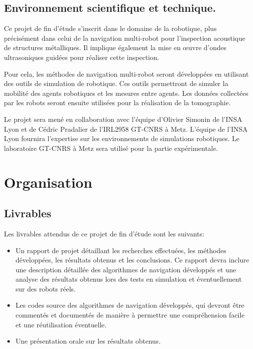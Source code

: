 \documentclass[init,francais,RandD]{rapportPFE}  %
\begin{document}
		\subsection{Environnement scientifique et technique.}
			Ce projet de fin d'étude s'inscrit dans le domaine de la robotique, plus précisément dans celui de la navigation multi-robot pour l'inspection acoustique de structures métalliques. Il implique également la mise en œuvre d'ondes ultrasoniques guidées pour réaliser cette inspection.

			Pour cela, les méthodes de navigation multi-robot seront développées en utilisant des outils de simulation de robotique. Ces outils permettront de simuler la mobilité des agents robotiques et les mesures entre agents. Les données collectées par les robots seront ensuite utilisées pour la réalisation de la tomographie.

			Le projet sera mené en collaboration avec l'équipe d'Olivier Simonin de l'INSA Lyon et de Cédric Pradalier de l'IRL2958 GT-CNRS à Metz. L'équipe de l'INSA Lyon fournira l'expertise sur les environnements de simulations robotiques. Le laboratoire GT-CNRS à Metz sera utilisé pour la partie expérimentale.
	\section{Organisation}
		\subsection{Livrables}
			Les livrables attendus de ce projet de fin d'étude sont les suivants:
			\begin{itemize}
				\item Un rapport de projet détaillant les recherches effectuées, les méthodes développées, les résultats obtenus et les conclusions. Ce rapport devra inclure une description détaillée des algorithmes de navigation développés et une analyse des résultats obtenus lors des tests en simulation et éventuellement sur des robots réels.
				\item Les codes source des algorithmes de navigation développés, qui devront être commentés et documentés de manière à permettre une compréhension facile et une réutilisation éventuelle.
				\item Une présentation orale sur les résultats obtenus.
			\end{itemize}
\end{document}
